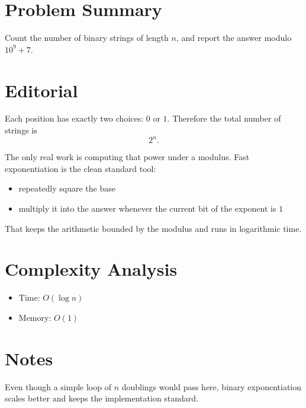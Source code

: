\section{Problem Summary}
Count the number of binary strings of length \(n\), and report the answer modulo \(10^9 + 7\).

\section{Editorial}
Each position has exactly two choices: \(0\) or \(1\). Therefore the total number of strings is
\[
2^n.
\]

The only real work is computing that power under a modulus. Fast exponentiation is the clean standard tool:
\begin{itemize}
\item repeatedly square the base
\item multiply it into the answer whenever the current bit of the exponent is \(1\)
\end{itemize}

That keeps the arithmetic bounded by the modulus and runs in logarithmic time.

\section{Complexity Analysis}
\begin{itemize}
\item Time: \(O(\log n)\)
\item Memory: \(O(1)\)
\end{itemize}

\section{Notes}
Even though a simple loop of \(n\) doublings would pass here, binary exponentiation scales better and keeps the implementation standard.
